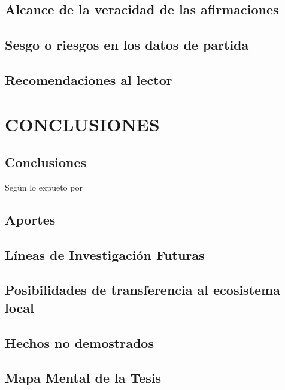 \documentclass[12pt,a4paper,oneside]{book}
\begin{document}
\section{Alcance de la veracidad de las afirmaciones}

\section{Sesgo o riesgos en los datos de partida}

\section{Recomendaciones al lector}


\chapter{ CONCLUSIONES}

\section{Conclusiones}

Según lo expueto por \cite{gheorghe_adapting_2001} 

\section{Aportes}

\section{Líneas de Investigación Futuras}

\section{Posibilidades de transferencia al ecosistema local}

\section{Hechos no demostrados}


\section{Mapa Mental de la Tesis}
\end{document}
